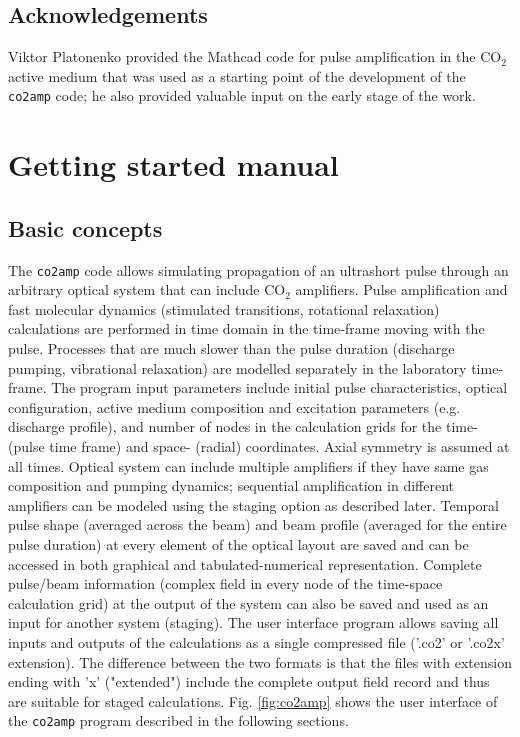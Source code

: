 \documentclass{report}
\begin{document}
\section{Acknowledgements}
Viktor Platonenko provided the Mathcad code for pulse amplification in the CO$_2$ active medium that was used as a starting point of the development of the \texttt{co2amp} code; he also provided valuable input on the early stage of the work.




\chapter{Getting started manual}

\section{Basic concepts}
The \texttt{co2amp} code allows simulating propagation of an ultrashort pulse through an arbitrary optical system that can include CO$_2$ amplifiers. Pulse amplification and fast molecular dynamics (stimulated transitions, rotational relaxation) calculations are performed in time domain in the time-frame moving with the pulse. Processes that are much slower than the pulse duration (discharge pumping, vibrational relaxation) are modelled separately in the laboratory time-frame.
The program input parameters include initial pulse characteristics, optical configuration, active medium composition and excitation parameters (e.g. discharge profile), and number of nodes in the calculation grids for the time- (pulse time frame) and space- (radial) coordinates. Axial symmetry is assumed at all times. Optical system can include multiple amplifiers if they have same gas composition and pumping dynamics; sequential amplification in different amplifiers can be modeled using the staging option as described later.
Temporal pulse shape (averaged across the beam) and beam profile (averaged for the entire pulse duration) at every element of the optical layout are saved and can be accessed in both graphical and tabulated-numerical representation. Complete pulse/beam information (complex field in every node of the time-space calculation grid) at the output of the system can also be saved and used as an input for another system (staging).
The user interface program allows saving all inputs and outputs of the calculations as a single compressed file ('.co2' or '.co2x' extension). The difference between the two formats is that the files with extension ending with 'x' ("extended") include the complete output field record and thus are suitable for staged calculations.
Fig. \ref{fig:co2amp} shows the user interface of the \texttt{co2amp} program described in the following sections.
\end{document}
